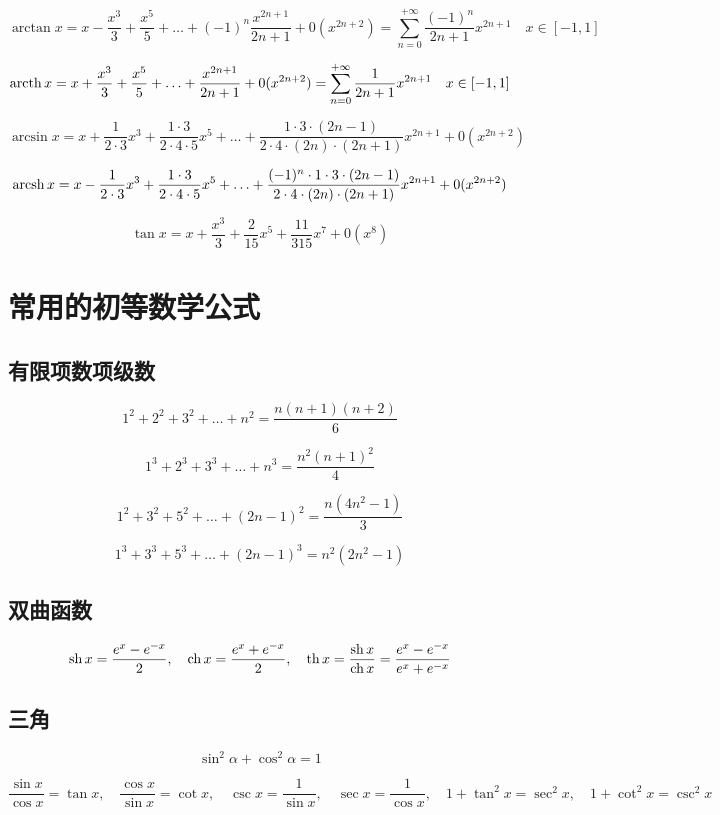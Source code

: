$$
\arctan x=x-\frac{ x^3}{3}+\frac{ x^5}{5}+\ldots+ (-1)^n \frac{x^{2n+1}}{2n+1}+
0(x^{2n+2})
=
\sum_{n=0}^{+\infty} \frac{(-1)^n}{2n+1} x^{2n+1}
\quad x\in[-1,1]
$$

$$
\operatorname{arcth} x=x+\frac{ x^3}{3}+\frac{ x^5}{5}+\ldots+ \frac{x^{2n+1}}{2n+1}+
0(x^{2n+2})
=
\sum_{n=0}^{+\infty} \frac{1}{2n+1} x^{2n+1}
\quad x\in[-1,1]
$$


$$
\arcsin x=
x+ \frac{ 1}{2\cdot3}x^3+\frac{1\cdot3}{2\cdot4\cdot5}x^5
+\ldots+
\frac{ 1\cdot3\cdot(2n-1)}{2\cdot4\cdot(2n)\cdot(2n+1)}x^{2n+1}+0(x^{2n+2})
$$

$$
\operatorname{arcsh} x=
x-\frac{ 1}{2\cdot3}x^3+\frac{1\cdot3}{2\cdot4\cdot5}x^5
+\ldots+
\frac{ (-1)^n \cdot1\cdot3\cdot(2n-1)}{2\cdot4\cdot(2n)\cdot(2n+1)}x^{2n+1}+0(x^{2n+2})
$$

$$
\tan x=
x+\frac{ x^3}{3}+\frac{2}{15}x^5+\frac{ 11}{315}x^7+0(x^8)
$$


\section{常用的初等数学公式}
\subsection{有限项数项级数}
$$
1^2 + 2^2 +3^2+\ldots+n^2=\frac{ n(n+1)(n+2)}{6}
$$

$$
1^3 + 2^3 +3^3+\ldots+n^3=\frac{ n^2(n+1)^2}{4}
$$

$$
1^2+3^2+5^2+\ldots+(2n-1)^2=\frac{n(4n^2-1)}{3}
$$

$$
1^3 + 3^3 +5^3+\ldots+(2n-1)^3=n^2(2n^2-1)
$$

\subsection{双曲函数}
$$
\operatorname{sh} x=\frac{e^x - e^{-x}}{2}, \quad \operatorname{ch} x=\frac{e^x+e^{-x}}{2}, \quad \operatorname{th} x = \frac{ \operatorname{sh} x}{\operatorname{ch} x}=\frac{e^x-e^{-x}}{e^x + e^{-x}}
$$

\subsection{三角}
$$
\sin ^2 \alpha + \cos^2 \alpha=1
$$

$$
\frac{ \sin x}{\cos x}=\tan x, \quad
\frac{ \cos x}{\sin x}=\cot x, \quad
\csc x=\frac{1}{\sin x}, \quad
\sec x=\frac{ 1}{\cos x}, \quad
1+\tan^2 x=\sec^2 x,\quad
1+\cot^2 x=\csc^2 x
$$

